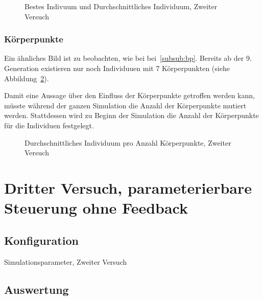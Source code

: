         \begin{figure}
          
          \caption{Bestes Indivuum und Durchschnittliches Individuum, Zweiter Versuch\label{fig:graphSecond}}
        \end{figure}

      \subsubsection{Körperpunkte}

        Ein ähnliches Bild ist zu beobachten, wie bei bei~\ref{subsub:bp}.
        Bereits ab der 9\@. Generation existieren nur noch Individuuen mit 7 Körperpunkten (siehe Abbildung~\ref{fig:graphBpSecond}).

        Damit eine Aussage über den Einfluss der Körperpunkte getroffen werden kann,
        müsste während der ganzen Simulation die Anzahl der Körperpunkte mutiert werden.
        Stattdessen wird zu Beginn der Simulation die Anzahl der Körperpunkte für die Individuen festgelegt.

        \begin{figure}
          
          \caption{Durchschnittliches Individuum pro Anzahl Körperpunkte, Zweiter Versuch\label{fig:graphBpSecond}}
        \end{figure}

    \section{Dritter Versuch, parameterierbare Steuerung ohne Feedback}

      \subsection{Konfiguration}

        \begin{table}[H]
          
          \caption{Simulationsparameter, Zweiter Versuch}
        \end{table}

      \subsection{Auswertung}

